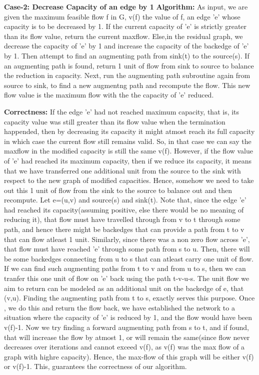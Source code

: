 \documentclass{article}
\newcommand\algo{\vspace{.10in}\textbf{Algorithm: }}
\newcommand\correctness{\vspace{.10in}\textbf{Correctness: }}
\begin{document}
    \textbf {Case-2: Decrease Capacity of an edge by 1} \newline    
    \algo As input, we are given the maximum feasible flow f in G, v(f) the value of f, an edge 'e' whose capacity is to be decreased by 1. If the current capacity of 'e' is strictly greater than its flow value, return the current maxflow. Else,in the residual graph, we decrease the capacity of 'e' by 1 and increase the capacity of the backedge of 'e' by 1. Then attempt to find an augmenting path from sink(t) to the source(s). If an augmenting path is found, return 1 unit of flow from sink to source to balance the reduction in capacity. Next, run the augmenting path subroutine again from source to sink, to find a new augmentng path and recompute the flow. This new flow value is the maximum flow with the the capacity of 'e' reduced. \newline

    \correctness If the edge 'e' had not reached maximum capacity, that is, its capacity value was still greater than its flow value when the termination happended, then by decreasing its capacity it might atmost reach its full capacity in which case the current flow still remains valid. So, in that case we can say the maxflow in the modified capacity is still the same v(f). However, if the flow value of 'e' had reached its maximum capacity, then if we reduce its capacity, it means that we have transferred one additional unit from the source to the sink with respect to the new graph of modified capacities. Hence, somehow we need to take out this 1 unit of flow from the sink to the source to balance out and then recompute. Let e=(u,v) and source(s) and sink(t). Note that, since the edge 'e' had reached its capacity(assuming positive, else there would be no meaning of reducing it), that flow must have travelled through from v to t through some path, and hence there might be backedges that can provide a path from t to v that can flow atleast 1 unit. Similarly, since there was a non zero flow across 'e', that flow must have reached 'e' through some path from s to u. Then, there will be some backedges connecting from u to s that can atleast carry one unit of flow. If we can find such augmenting paths from t to v and from u to s, then we can tranfer this one unit of flow on 'e' back using the path t-v-u-s. The unit flow we aim to return can be modeled as an additional unit on the backedge of e, that (v,u). Finding the augmenting path from t to s, exactly serves this purpose. Once , we do this and return the flow back, we have established the network to a situation where the capacity of 'e' is reduced by 1, and the flow would have been v(f)-1. Now we try finding a forward augmenting path from s to t, and if found, that will increase the flow by atmost 1, or will remain the same(since flow never decreases over iterations and cannot exceed v(f), as v(f) was the max flow of a graph with highre capacity). Hence, the max-flow of this graph will be either v(f) or v(f)-1. This, guarantees the correctness of our algorithm. 
   
\end{document}
